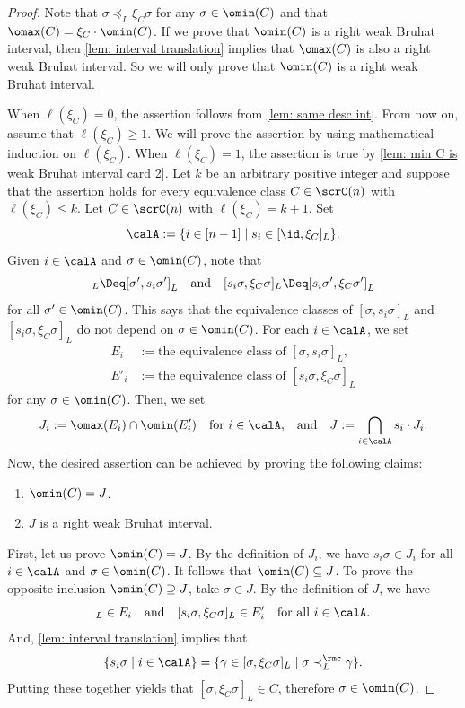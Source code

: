 \documentclass[12pt, reqno]{amsart}
\theoremstyle{definition}
\numberwithin{equation}{section} \numberwithin{figure}{section}
\numberwithin{table}{section}
\begin{document}
\begin{proof}
Note that $\sigma \preceq_L \xi_C \sigma$ for any $\sigma \in \omin(C)$ and that $\omax(C) = \xi_C \cdot \omin(C)$.
If we prove that $\omin(C)$ is a right weak Bruhat interval, then \cref{lem: interval translation} implies that $\omax(C)$ is also a right weak Bruhat interval.
So we will only prove that $\omin(C)$ is a right weak Bruhat interval.

When $\ell(\xi_C) = 0$, the assertion follows from \cref{lem: same desc int}.
From now on, assume that $\ell(\xi_C) \geq 1$.
We will prove the assertion by using mathematical induction on $\ell(\xi_C)$.
When $\ell(\xi_C) = 1$, the assertion is true by \cref{lem: min C is weak Bruhat interval card 2}.
Let $k$ be an arbitrary positive integer and suppose that the assertion holds for every equivalence class $C \in \scrC(n)$ with $\ell(\xi_C) \leq k$.
Let $C \in \scrC(n)$ with $\ell(\xi_C) = k+1$.
Set
$$
\calA := \{i \in [n-1] \mid s_i \in [\id, \xi_C]_L \}.
$$
Given $i \in \calA$ and $\sigma \in \omin(C)$, note that 
\begin{align*}
[\sigma, s_i \sigma]_L \Deq [\sigma', s_i \sigma']_L
\quad \text{and} \quad
[s_i \sigma, \xi_C \sigma]_L \Deq [s_i\sigma', \xi_C \sigma']_L
\end{align*}
for all $\sigma' \in \omin(C)$.
This says that the equivalence classes of $[\sigma, s_i \sigma]_L$ and $[s_i\sigma, \xi_C \sigma]_L$
do not depend on  $\sigma \in \omin(C)$.
For each $i \in \calA$,  we set 
\begin{align*}
E_i & := \text{the equivalence class of $[\sigma, s_i \sigma]_L$,}
\\
E'_i & := \text{the equivalence class of $[s_i \sigma, \xi_C \sigma]_L$}
\end{align*}
for any  $\sigma \in \omin(C)$.
Then, we set 
\begin{align*}
J_i := \omax(E_i) \cap \omin(E'_i) \quad \text{for $i \in \calA$,} \quad \text{and} \quad 
J := \bigcap_{i \in \calA}s_i \cdot J_i.
\end{align*}
Now, the desired assertion can be achieved by proving the following claims:
\begin{enumerate}[label = {(\roman*)}]
\item $\omin(C) = J$.
\item $J$ is a right weak Bruhat interval.
\end{enumerate}

First, let us prove $\omin(C) = J$.
By the definition of $J_i$, we have $s_i \sigma \in J_i$ for all $i \in \calA$ and $\sigma \in \omin(C)$. 
It follows that $\omin(C) \subseteq J$.
To prove the opposite inclusion $\omin(C) \supseteq J$, take $\sigma \in J$.
By the definition of $J$, we have
\begin{equation*}
[\sigma, s_i \sigma]_L  \in E_i 
\quad \text{and} \quad 
[s_i \sigma ,\xi_C \sigma]_L \in E'_i
\quad \text{for all $i \in \calA$}. 
\end{equation*}
And, \cref{lem: interval translation} implies that 
$$
\{s_i \sigma \mid i \in \calA \} = \{\gamma \in [\sigma, \xi_C\sigma]_L \mid \sigma \prec^\rmc_L \gamma \}.
$$
Putting these together yields that $[\sigma, \xi_C \sigma]_L \in C$, therefore $\sigma \in \omin(C)$.


\end{proof}
\end{document}
